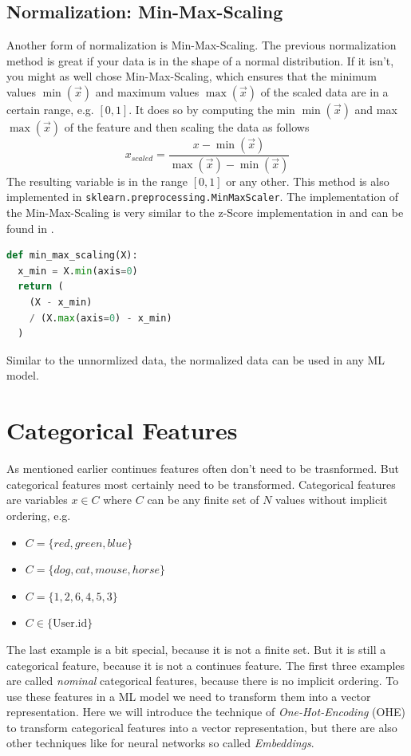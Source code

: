 \subsection{Normalization: Min-Max-Scaling}
Another form of normalization is Min-Max-Scaling. 
The previous normalization method is great if your data is in the shape of a normal distribution.
If it isn't, you might as well chose Min-Max-Scaling, which ensures that the minimum values $\min(\vec{x})$ and maximum values $\max(\vec{x})$ of the scaled data are in a certain range, e.g. $[0, 1]$.
It does so by computing the min $\min(\vec{x})$ and max $\max(\vec{x})$ of the feature and then scaling the data as follows
\begin{equation}
  x_{scaled} = \frac{x - \min(\vec{x})}{\max(\vec{x}) - \min(\vec{x})}
\end{equation}
The resulting variable is in the range $[0, 1]$ or any other.
This method is also implemented in \lstinline{sklearn.preprocessing.MinMaxScaler}.
The implementation of the Min-Max-Scaling is very similar to the z-Score implementation in  and can be found in .

\begin{lstlisting}[language=Python, caption={Min-Max-Scaling in Python}, label={code:min-max-scaling}]
def min_max_scaling(X):
  x_min = X.min(axis=0)
  return (
    (X - x_min)
    / (X.max(axis=0) - x_min)
  )
\end{lstlisting}

Similar to the unnormlized data, the normalized data can be used in any ML model.

\section{Categorical Features}
As mentioned earlier continues features often don't need to be trasnformed. But categorical features most certainly need to be transformed.
Categorical features are variables $x \in C$ where $C$ can be any finite set of $N$ values without implicit ordering, e.g.
\begin{itemize}
  \item $C = \{red, green, blue\}$
  \item $C = \{dog, cat, mouse, horse\}$
  \item $C = \{1, 2, 6, 4, 5, 3\}$
  \item $C \in \{\text{User.id}\}$
\end{itemize}
The last example is a bit special, because it is not a finite set. But it is still a categorical feature, because it is not a continues feature.
The first three examples are called \textit{nominal} categorical features, because there is no implicit ordering.
To use these features in a ML model we need to transform them into a vector representation.
Here we will introduce the technique of \textit{One-Hot-Encoding} (OHE) to transform categorical features into a vector representation, but there are also
other techniques like for neural networks so called \textit{Embeddings}.
